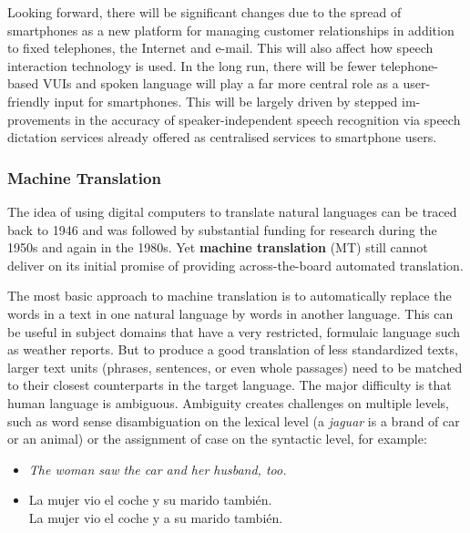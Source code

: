 \begin{multicols}{2}
Looking forward, there will be significant changes due to the spread of smartphones as a new platform for managing customer relationships in addition to fixed telephones, the Internet and e-mail. This will also affect how speech interaction technology is used. In the long run, there will be fewer telephone-based VUIs and spoken language will play a far more central role as a user-friendly input for smartphones. This will be largely driven by stepped im-provements in the accuracy of speaker-independent speech recognition via speech dictation services already offered as centralised services to smartphone users.

\subsubsection{Machine Translation}

The idea of using digital computers to translate natural languages can be traced back to 1946 and was followed by substantial funding for research during the 1950s and again in the 1980s. Yet \textbf{machine translation} (MT) still cannot deliver on its initial promise of providing across-the-board automated translation.


The most basic approach to machine translation is to automatically replace the words in a text in one natural language by words in another language. This can be useful in subject domains that have a very restricted, formulaic language such as weather reports. But to produce a good translation of less standardized texts, larger text units (phrases, sentences, or even whole passages) need to be matched to their closest counterparts in the target language. The major difficulty is that human language is ambiguous. Ambiguity creates challenges on multiple levels, such as word sense disambiguation on the lexical level (a \textit{jaguar} is a brand of car or an animal) or the assignment of case on the syntactic level, for example:

\begin{itemize}
  \item \textit{The woman saw the car and her husband, too.}
  \item La mujer vio el coche y su marido también.\\
    La mujer vio el coche y a su marido también.
\end{itemize}


\end{multicols}
